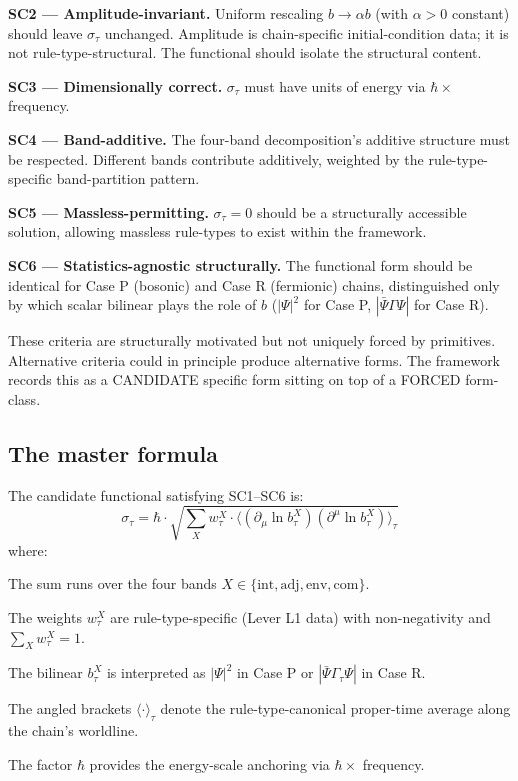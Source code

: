 \documentclass[11pt,a4paper]{article}
\begin{document}
\textbf{SC2 --- Amplitude-invariant.} Uniform rescaling $b \to \alpha b$ (with $\alpha > 0$ constant) should leave $\sigma_\tau$ unchanged. Amplitude is chain-specific initial-condition data; it is not rule-type-structural. The functional should isolate the structural content.

\textbf{SC3 --- Dimensionally correct.} $\sigma_\tau$ must have units of energy via $\hbar \times$ frequency.

\textbf{SC4 --- Band-additive.} The four-band decomposition's additive structure must be respected. Different bands contribute additively, weighted by the rule-type-specific band-partition pattern.

\textbf{SC5 --- Massless-permitting.} $\sigma_\tau = 0$ should be a structurally accessible solution, allowing massless rule-types to exist within the framework.

\textbf{SC6 --- Statistics-agnostic structurally.} The functional form should be identical for Case P (bosonic) and Case R (fermionic) chains, distinguished only by which scalar bilinear plays the role of $b$ ($|\Psi|^2$ for Case P, $|\bar\Psi\Gamma\Psi|$ for Case R).

These criteria are structurally motivated but not uniquely forced by primitives. Alternative criteria could in principle produce alternative forms. The framework records this as a CANDIDATE specific form sitting on top of a FORCED form-class.

\subsection{The master formula}

The candidate functional satisfying SC1--SC6 is:
\[
\sigma_\tau = \hbar \cdot \sqrt{\sum_X w_\tau^X \cdot \langle(\partial_\mu \ln b_\tau^X)(\partial^\mu \ln b_\tau^X)\rangle_\tau}
\]
where:

The sum runs over the four bands $X \in \{\mathrm{int}, \mathrm{adj}, \mathrm{env}, \mathrm{com}\}$.

The weights $w_\tau^X$ are rule-type-specific (Lever L1 data) with non-negativity and $\sum_X w_\tau^X = 1$.

The bilinear $b_\tau^X$ is interpreted as $|\Psi|^2$ in Case P or $|\bar\Psi\Gamma_\tau\Psi|$ in Case R.

The angled brackets $\langle\cdot\rangle_\tau$ denote the rule-type-canonical proper-time average along the chain's worldline.

The factor $\hbar$ provides the energy-scale anchoring via $\hbar \times$ frequency.
\end{document}
